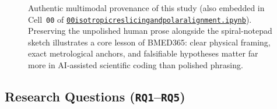 \documentclass[10pt,a4paper]{article}
\renewcommand{\_}{\origunderscore\allowbreak}
\newcommand{\ghblob}{https://github.com/arvidl/BMED365-2027/blob/main}
\newcommand{\repodir}{Lab4-Comp-Imag/Kiwi-challenge/docs/neurosymbolic-report}
\newcommand{\nbref}[1]{\href{\ghblob/\repodir/notebooks/#1}{\texttt{#1}}}
\begin{document}
\begin{figure}[htbp]
\begin{tcolorbox}
\begin{minipage}[t]{0.61\linewidth}
\end{minipage}
\end{tcolorbox}
\caption[Multimodal human seed (handwritten sketch and verbatim prompt)]{Authentic multimodal provenance of this study (also embedded in Cell~\texttt{00} of \nbref{00\_isotropic\_reslicing\_and\_polar\_alignment.ipynb}). Preserving the unpolished human prose alongside the spiral-notepad sketch illustrates a core lesson of BMED365: clear physical framing, exact metrological anchors, and falsifiable hypotheses matter far more in AI-assisted scientific coding than polished phrasing.}
\label{fig:sketch_provenance}
\end{figure}

\subsection{Research Questions (\texttt{RQ1}--\texttt{RQ5})}
\label{sec:intro_rqs}
\end{document}
